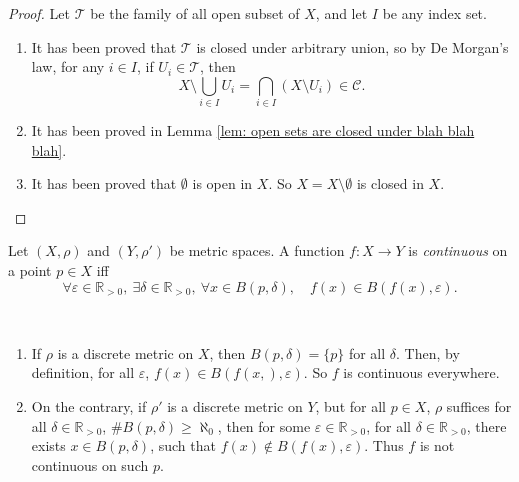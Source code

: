 \begin{proof}
	Let $\mathcal T$ be the family of all open subset of $X$, and let $I$ be any index set.
	\begin{enumerate}
		\item It has been proved that $\mathcal T$ is closed under arbitrary union, so by De Morgan's law, for any $i \in I$, if $U_i \in \mathcal T$, then
			$$
			X \setminus \bigcup_{i \in I} U_i = \bigcap_{i \in I} (X \setminus U_i) \in \mathcal C.
			$$
		\item It has been proved in Lemma \ref{lem: open sets are closed under blah blah blah}.
		\item It has been proved that $\emptyset$ is open in $X$. So $X = X \setminus \emptyset$ is closed in $X$.
	\end{enumerate}
\end{proof}



\begin{definition}
	Let $(X, \rho)$ and $(Y, \rho')$ be metric spaces. A function $f: X \to Y$ is \textit{continuous} on a point $p \in X$ iff
	$$
	\forall \varepsilon \in \mathbb R_{> 0}, \ \exists \delta \in \mathbb R_{> 0}, \ \forall x \in B(p, \delta), \quad f(x) \in B(f(x), \varepsilon).
	$$
\end{definition}


\begin{note} \
	\begin{enumerate}
		\item If $\rho$ is a discrete metric on $X$, then $B(p, \delta) = \{p\}$ for all $\delta$. Then, by definition, for all $\varepsilon$, $f(x) \in B(f(x,), \varepsilon)$. So $f$ is continuous everywhere.
		\item On the contrary, if $\rho'$ is a discrete metric on $Y$, but for all $p\in X$, $\rho$ suffices for all $\delta \in \mathbb R_{> 0}$, $\# B(p, \delta) \ge \aleph_0$, then for some $\varepsilon \in \mathbb R_{>0}$, for all $\delta \in \mathbb R_{> 0}$, there exists $x \in B(p, \delta)$, such that $f(x) \notin B(f(x), \varepsilon)$. Thus $f$ is not continuous on such $p$.
	\end{enumerate}
\end{note}































%